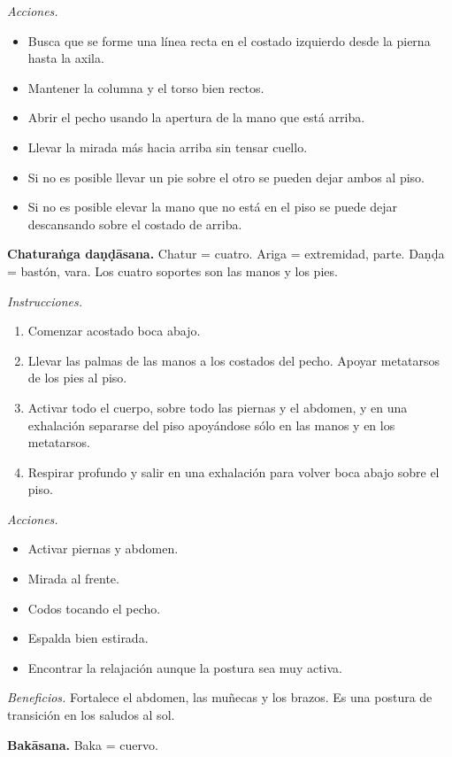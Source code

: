 \emph{Acciones.}
\begin{itemize}
\item Busca que se forme una línea recta en
el costado izquierdo desde la pierna hasta la
axila.
\item Mantener la columna y el torso bien
rectos.
\item Abrir el pecho usando la apertura de la
mano que está arriba.
\item Llevar la mirada más hacia arriba sin
tensar cuello.
\item Si no es posible llevar un pie sobre el
otro se pueden dejar ambos al piso.
\item Si no es posible elevar la mano que no
está en el piso se puede dejar descansando
sobre el costado de arriba.
\end{itemize}

\medskip\noindent\textbf{Chaturaṅga
daṇḍāsana.}
Chatur = cuatro. Ariga = extremidad, parte.
Daṇḍa = bastón, vara. Los cuatro soportes son
las manos y los pies.

\emph{Instrucciones.}
\begin{enumerate}
\item Comenzar acostado boca abajo.
\item Llevar las palmas de las manos a los
costados del pecho. Apoyar metatarsos de los
pies al piso.
\item Activar todo el cuerpo, sobre todo las
piernas y el abdomen, y en una exhalación
separarse del piso apoyándose sólo en las
manos y en los metatarsos.
\item Respirar profundo y salir en una
exhalación para volver boca abajo sobre el
piso.
\end{enumerate}

\emph{Acciones.}
\begin{itemize}
\item Activar piernas y abdomen.
\item Mirada al frente.
\item Codos tocando el pecho.
\item Espalda bien estirada.
\item Encontrar la relajación aunque la
postura sea muy activa.
\end{itemize}

\emph{Beneficios.} Fortalece el abdomen, las
muñecas y los brazos. Es una postura de
transición en los saludos al sol.

\medskip\noindent\textbf{Bakāsana.}
Baka = cuervo.


